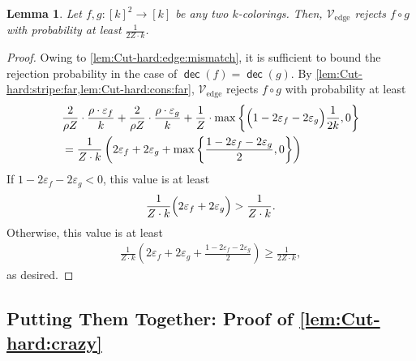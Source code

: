 \documentclass[11pt,fleqn]{article}
\renewcommand{\geq}{\geqslant}
\renewcommand{\epsilon}{\varepsilon}
\DeclareMathOperator{\dec}{\mathsf{dec}}
\newcommand{\V}{\calV}
\newcommand{\f}{f}
\newcommand{\g}{g}
\newcommand{\Vedge}{\V_\mathrm{edge}}
\newcommand{\calV}{\mathcal{V}}
\newtheorem{lemma}[theorem]{Lemma}
\theoremstyle{definition}
\numberwithin{equation}{section}
\begin{document}
\begin{lemma}
\label{lem:Cut-hard:edge:any}
    Let $\f,\g \colon [k]^2 \to [k]$ be any two $k$-colorings.
    Then, $\Vedge$ rejects $\f \circ \g$ with probability at least
    $\frac{1}{2Z \cdot k}$.
\end{lemma}
\begin{proof} Owing to \cref{lem:Cut-hard:edge:mismatch},
    it is sufficient to bound the rejection probability in the case of $\dec(\f) = \dec(\g)$.
By \cref{lem:Cut-hard:stripe:far,lem:Cut-hard:cons:far},
$\Vedge$ rejects $\f \circ \g$ with probability at least
\begin{align}
\begin{aligned}
    & \frac{2}{\rho Z} \cdot \frac{\rho \cdot \epsilon_{\f}}{k}
        + \frac{2}{\rho Z} \cdot \frac{\rho \cdot \epsilon_{\g}}{k}
        + \frac{1}{Z} \cdot \max\left\{
            \Bigl(1-2\epsilon_{\f} -2\epsilon_{\g}\Bigr)\frac{1}{2k}, 0
        \right\}
    \\
    & = \frac{1}{Z\cdot k} \left(  
        2\epsilon_{\f} + 2\epsilon_{\g}
        + \max\left\{
            \frac{1-2\epsilon_{\f} -2\epsilon_{\g}}{2}, 0
        \right\}
    \right)
\end{aligned}
\end{align}
If $1-2\epsilon_{\f} -2\epsilon_{\g} < 0$,
this value is at least
\begin{align}
    \frac{1}{Z\cdot k} \Bigl(  
        2\epsilon_{\f} + 2\epsilon_{\g}
    \Bigr)
    > \frac{1}{Z \cdot k}.
\end{align}
Otherwise, this value is at least
\begin{align}
    \frac{1}{Z\cdot k} \left(  
        2\epsilon_{\f} + 2\epsilon_{\g}
        + \frac{1-2\epsilon_{\f} -2\epsilon_{\g} }{2}
    \right)
    \geq \frac{1}{2Z \cdot k},
\end{align}
as desired.
\end{proof}


\subsection{Putting Them Together: Proof of \texorpdfstring{\cref{lem:Cut-hard:crazy}}{Lemma~\protect\ref{lem:Cut-hard:crazy}}}
\label{sec:Cut-hard:crazy}
\end{document}
